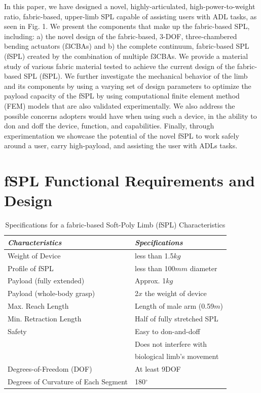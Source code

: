 \documentclass[letterpaper, 10 pt, conference]{ieeeconf}  %
\begin{document}
In this paper, we have designed a novel, highly-articulated, high-power-to-weight ratio, fabric-based, upper-limb SPL capable of assisting users with ADL tasks, as seen in Fig. 1. We present the components that make up the fabric-based SPL, including: a) the novel design of the fabric-based, 3-DOF, three-chambered bending actuators (f3CBAs) and b) the complete continuum, fabric-based SPL (fSPL) created by the combination of multiple f3CBAs. We provide a material study of various fabric material tested to achieve the current design of the fabric-based SPL (fSPL). We further investigate the mechanical behavior of the limb and its components by using a varying set of design parameters to optimize the payload capacity of the fSPL by using computational finite element method (FEM) models that are also validated experimentally. We also address the possible concerns adopters would have when using such a device, in the ability to don and doff the device, function, and capabilities. Finally, through experimentation we showcase the potential of the novel fSPL to work safely around a user, carry high-payload, and assisting the user with ADLs tasks. 


\section{fSPL Functional Requirements and Design}
\label{sec:func_req}
\begin{table}[t!]
\caption{Specifications for a fabric-based Soft-Poly Limb (fSPL) Characteristics} 
\label{tab:spec_table}
	\begin{tabularx}{0.48\textwidth}{*2l}    \toprule\toprule
	\textbf{\emph{Characteristics}} & \textbf{\emph{Specifications}} \\\midrule
	Weight of Device    & less than 1.5$kg$  \\ 
	Profile of fSPL & less than 100$mm$ diameter \\ 
	Payload (fully extended)    & Approx. 1$kg$  \\ 
	Payload (whole-body grasp) & 2$x$ the weight of device \\ 
	Max. Reach Length    & Length of male arm (0.59$m$)  \\ 
	Min. Retraction Length & Half of fully stretched SPL \\ 
	Safety    & Easy to don-and-doff \\ 
	 &Does not interfere with\\
     &biological limb's movement\\
	Degrees-of-Freedom (DOF) & At least 9DOF \\ 
	Degrees of Curvature of Each Segment & 180$^{\circ}$ \\\bottomrule
	 \hline
	\end{tabularx}
\end{table}
\end{document}
